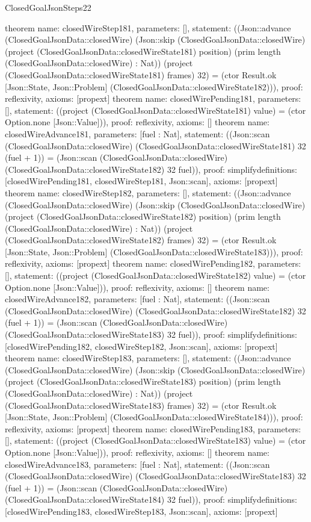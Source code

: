\begin{lexlean}{ClosedGoalJsonSteps22}
\begin{semanticmodule}
{}
theorem{
 name: closedWireStep181, parameters: [],
 statement: ((Json::advance (ClosedGoalJsonData::closedWire) (Json::skip (ClosedGoalJsonData::closedWire) (project (ClosedGoalJsonData::closedWireState181) position) (prim length (ClosedGoalJsonData::closedWire) : Nat)) (project (ClosedGoalJsonData::closedWireState181) frames) 32) = (ctor Result.ok [Json::State, Json::Problem] (ClosedGoalJsonData::closedWireState182))), proof: reflexivity{}, axioms: [propext]
}
theorem{
 name: closedWirePending181, parameters: [],
 statement: ((project (ClosedGoalJsonData::closedWireState181) value) = (ctor Option.none [Json::Value])), proof: reflexivity{}, axioms: []
}
theorem{
 name: closedWireAdvance181, parameters: [fuel : Nat],
 statement: ((Json::scan (ClosedGoalJsonData::closedWire) (ClosedGoalJsonData::closedWireState181) 32 (fuel + 1)) = (Json::scan (ClosedGoalJsonData::closedWire) (ClosedGoalJsonData::closedWireState182) 32 fuel)), proof: simplify{definitions: [closedWirePending181, closedWireStep181, Json::scan]}, axioms: [propext]
}
theorem{
 name: closedWireStep182, parameters: [],
 statement: ((Json::advance (ClosedGoalJsonData::closedWire) (Json::skip (ClosedGoalJsonData::closedWire) (project (ClosedGoalJsonData::closedWireState182) position) (prim length (ClosedGoalJsonData::closedWire) : Nat)) (project (ClosedGoalJsonData::closedWireState182) frames) 32) = (ctor Result.ok [Json::State, Json::Problem] (ClosedGoalJsonData::closedWireState183))), proof: reflexivity{}, axioms: [propext]
}
theorem{
 name: closedWirePending182, parameters: [],
 statement: ((project (ClosedGoalJsonData::closedWireState182) value) = (ctor Option.none [Json::Value])), proof: reflexivity{}, axioms: []
}
theorem{
 name: closedWireAdvance182, parameters: [fuel : Nat],
 statement: ((Json::scan (ClosedGoalJsonData::closedWire) (ClosedGoalJsonData::closedWireState182) 32 (fuel + 1)) = (Json::scan (ClosedGoalJsonData::closedWire) (ClosedGoalJsonData::closedWireState183) 32 fuel)), proof: simplify{definitions: [closedWirePending182, closedWireStep182, Json::scan]}, axioms: [propext]
}
theorem{
 name: closedWireStep183, parameters: [],
 statement: ((Json::advance (ClosedGoalJsonData::closedWire) (Json::skip (ClosedGoalJsonData::closedWire) (project (ClosedGoalJsonData::closedWireState183) position) (prim length (ClosedGoalJsonData::closedWire) : Nat)) (project (ClosedGoalJsonData::closedWireState183) frames) 32) = (ctor Result.ok [Json::State, Json::Problem] (ClosedGoalJsonData::closedWireState184))), proof: reflexivity{}, axioms: [propext]
}
theorem{
 name: closedWirePending183, parameters: [],
 statement: ((project (ClosedGoalJsonData::closedWireState183) value) = (ctor Option.none [Json::Value])), proof: reflexivity{}, axioms: []
}
theorem{
 name: closedWireAdvance183, parameters: [fuel : Nat],
 statement: ((Json::scan (ClosedGoalJsonData::closedWire) (ClosedGoalJsonData::closedWireState183) 32 (fuel + 1)) = (Json::scan (ClosedGoalJsonData::closedWire) (ClosedGoalJsonData::closedWireState184) 32 fuel)), proof: simplify{definitions: [closedWirePending183, closedWireStep183, Json::scan]}, axioms: [propext]
}
\end{semanticmodule}
\end{lexlean}
